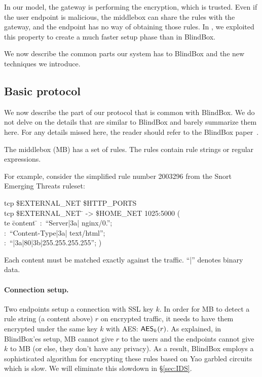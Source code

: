In our model, the gateway is performing the encryption, which is trusted. Even if the
user endpoint is malicious, the middlebox can share the rules with the gateway, and the
endpoint has no way of obtaining those rules. In \sys, we exploited this property to create a
much faster setup phase than in BlindBox. 




We now describe the common parts our system has to BlindBox and the new techniques we introduce. 





\subsection{Basic protocol}

We now describe the part of our protocol that is common with BlindBox. 
We do not delve on the details that are similar to BlindBox and barely summarize them here.
For any details missed here, the reader should refer to the BlindBox paper~\cite{blindbox}.

The middlebox (MB) has a set of rules. The rules contain rule strings or regular expressions. 

For example, consider the  simplified rule number 2003296 from the Snort Emerging Threats ruleset:

\begingroup     \fontsize{9pt}{10pt}\selectfont
\begin{tabbing}
 tcp \$EXTERNAL\_NET \$HTTP\_PORTS \\
 tcp   \$EXTERNAL\_NET  \= \kill
\> -> \$HOME\_NET 1025:5000 ( \\

te \= content \= \kill
\> :\ ``Server|3a| nginx/0.'';  \\
\> :\ ``Content-Type|3a| text/html''; \\
\> :\ ``|3a|80|3b|255.255.255.255''; )
\end{tabbing}
\endgroup

Each content must be matched exactly against the traffic. ``|'' denotes binary data. 

\paragraph{Connection setup.} 
Two endpoints setup a connection with SSL key $k$. 
In order for MB to detect a rule string (a content above) $r$ on encrypted traffic, it needs to have them encrypted 
under the same key $k$ with AES: $\mathsf{AES}_k(r)$. 
As explained, in BlindBox'es setup, MB cannot give $r$ to the users and the endpoints cannot give $k$ to MB 
(or else, they don't have any privacy). As a result, BlindBox employs a sophisticated algorithm for encrypting
these rules based on Yao garbled circuits~\cite{} which is slow. We will eliminate this slowdown in \S\ref{sec:IDS}.


